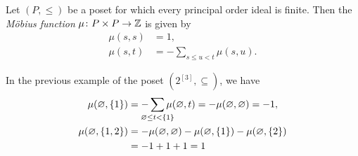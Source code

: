 \begin{definition*} \label{def:poset:mobius_function}
    Let $(P, \le)$ be a poset for which every principal order ideal is
    finite.
    Then the \emph{Möbius function} $\mu\colon P \times P \to \mathbb{Z}$ is given by
    \begin{align*}
        \mu(s, s) &= 1, \\
        \mu(s, t) &= -\sum_{s \le u < t} \mu(s, u).
    \end{align*}
\end{definition*}
\begin{example}
    In the previous example of the poset $(2^{[3]}, \subseteq)$, we have
    \begin{align*}
        \mu(\O, \set{1}) &= -\smashoperator{\sum_{\O \le t < \set{1}}}
            \mu(\O, t) = -\mu(\O, \O) = -1, \\
        \mu(\O, \set{1, 2}) &= -\mu(\O, \O) - \mu(\O, \set{1}) - \mu(\O, \set{2}) \\
            &= -1 + 1 + 1 = 1
    \end{align*}
\end{example}

